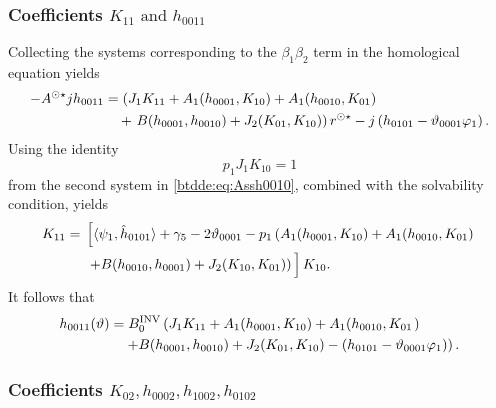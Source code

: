 \subsubsection{Coefficients \texorpdfstring{$K_{11} \text{ and } h_{0011}$}{K11
				and h0011}}

Collecting the systems corresponding to the $\beta_1 \beta_2$ term in the
homological equation yields
\begin{equation}
\label{btdde:eq:Assh0011}
\begin{aligned}
-A^{\odot\star} jh_{0011} &= \left(J_1 K_{11} + A_1(h_{0001},K_{10}) + A_1(h_{0010},K_{01}) \right. \\
						& \quad +
                        \left. B(h_{0001},h_{0010}) + J_2(K_{01},K_{10})\right)r^{\odot\star} - j\left(h_{0101}-\vartheta_{0001}\varphi_1\right).
\end{aligned}
\end{equation}
Using the identity 
%
\begin{equation*}
   p_1J_1K_{10}=1 
\end{equation*}
from the second system in \cref{btdde:eq:Assh0010}, combined with the solvability
condition, yields
\begin{equation}
\begin{aligned}
    K_{11}={}& \left[\langle \psi_1, \hat h_{0101} \rangle + \gamma_5 - 2\vartheta_{0001} 
                 - p_1\left(A_1(h_{0001},K_{10}) + A_1(h_{0010},K_{01}) \right. \right. \nonumber\\
             &\left.\left. + B(h_{0010},h_{0001}) + J_2(K_{10},K_{01}) \right)\vphantom{\left< \psi_1, \hat h_{0101} \right>} \right]K_{10}.
\end{aligned}
\end{equation}
It follows that 
\begin{equation}
\begin{aligned}
h_{0011}(\vartheta) &= B^{\mathrm{INV}}_{0} \left( J_1 K_{11} + A_1(h_{0001},K_{10}) + A_1(h_{0010},K_{01} \right.) \\
						& \left. \quad + B(h_{0001},h_{0010}) + J_2(K_{01},K_{10})-\left(h_{0101}-\vartheta_{0001}\varphi_1\right)\right).
\end{aligned}
\end{equation}

\subsubsection{Coefficients
				\texorpdfstring{$K_{02},h_{0002},h_{1002},h_{0102}$}
				{h0002,K02,h1002,h0102}}

